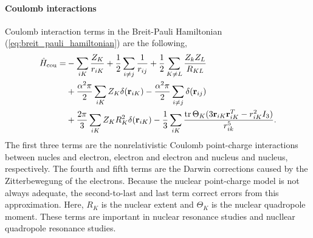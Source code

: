     \paragraph{Coulomb interactions}

    Coulomb interaction terms in the Breit-Pauli Hamiltonian (\autoref{eq:breit_pauli_hamiltonian})
    are the following,
    \begin{equation}
        \begin{aligned}
            \hat{H}_{\text{cou}} 
                =& -\sum_{iK}\frac{Z_K}{r_{iK}} 
                    + \frac{1}{2}\sum_{i \neq j} \frac{1}{r_{ij}} 
                    + \frac{1}{2}\sum_{K \neq L} \frac{Z_k Z_L}{R_{KL}} \\
                &+ \frac{\alpha^2\pi}{2} \sum_{iK} Z_{K}\delta (\vb{r}_{iK})
                - \frac{\alpha^2\pi}{2} \sum_{i \neq j} \delta (\vb{r}_{ij}) \\
                &+ \frac{2\pi}{3} \sum_{iK}Z_K R^2_K \delta (\vb{r}_{iK})
                    - \frac{1}{3} \sum_{iK}
                        \frac{\tr \Theta_K (3\vb{r}_{iK} \vb{r}^T_{iK} - r^2_{iK}I_3)}
                        {r^5_{ik}}.
        \end{aligned}
    \end{equation}
    The first three terms are the nonrelativistic Coulomb point-charge interactions between
    nucles and electron, electron and electron and nucleus and nucleus, respectively.
    The fourth and fifth terms are the Darwin corrections caused by the Zitterbewegung
    of the electrons. Because the nuclear point-charge model is not always adequate, the
    second-to-last and last term correct errors from this approximation. Here, $R_K$ is 
    the nuclear extent and $\Theta_K$ is the nuclear quadropole moment. These terms are
    important in nuclear resonance studies\cite{kutzelnigg1990perturbation} and nucllear quadropole resonance
    studies\cite{abragam1961principles}.

